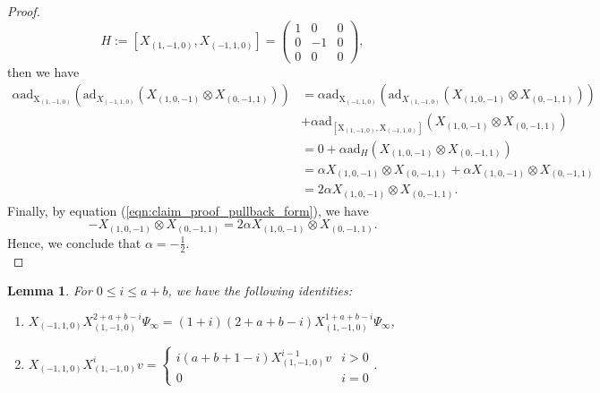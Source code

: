 \documentclass[11pt, a4paper]{amsart}
\theoremstyle{plain}
\newtheorem{lemma}[theorem]{Lemma}
\theoremstyle{definition}
\numberwithin{equation}{section}
\begin{document}
\begin{proof}
    \begin{equation*}
        H := [X_{(1, -1, 0)}, X_{(-1, 1, 0)}] = \left(\begin{matrix}
                                                    1 & 0 & 0 \\
                                                    0 & -1 & 0 \\
                                                    0 & 0 & 0 
                                                \end{matrix}\right), 
    \end{equation*}
    then we have 
    \begin{align*}
        \alpha \mathrm{ad_{X_{(1, -1, 0)}}}(\mathrm{ad}_{X_{(-1, 1, 0)}}(X_{(1, 0, -1)} \otimes X_{(0, -1, 1)})) &= \alpha \mathrm{ad_{X_{(-1, 1, 0)}}}(\mathrm{ad}_{X_{(1, -1, 0)}}(X_{(1, 0, -1)} \otimes X_{(0, -1, 1)})) \\
        & + \alpha \mathrm{ad_{[X_{(1, -1, 0)}, X_{(-1, 1, 0)}]}}(X_{(1, 0, -1)} \otimes X_{(0, -1, 1)}) \\
        & = 0 + \alpha \mathrm{ad}_{H}(X_{(1, 0, -1)} \otimes X_{(0, -1, 1)}) \\
        & = \alpha X_{(1, 0, -1)} \otimes X_{(0, -1, 1)} + \alpha X_{(1, 0, -1)} \otimes X_{(0, -1, 1)} \\
        & = 2\alpha X_{(1, 0, -1)} \otimes X_{(0, -1, 1)}. 
    \end{align*}
    Finally, by equation (\ref{eqn:claim_proof_pullback_form}), we have 
    \begin{equation*}
        - X_{(1, 0, -1)} \otimes X_{(0, -1, 1)} = 2\alpha X_{(1, 0, -1)} \otimes X_{(0, -1, 1)}.
    \end{equation*}
    Hence, we conclude that $\alpha = -\frac{1}{2}$. \\
\end{proof}

\begin{lemma}
\label{Lemma: lower and up vector}
For $0 \le i \le a + b$, we have the following identities: 
\begin{enumerate} 
        \item $X_{(-1, 1, 0)}X^{2 + a + b - i}_{(1, -1, 0)} \Psi_{\infty}  = (1 + i)(2 + a + b - i)X_{(1, -1, 0)}^{1 + a + b - i} \Psi_{\infty}$, 
        \item $X_{(-1, 1, 0)} X_{(1, -1 ,0)}^{i} v = \begin{cases}
                                                            i(a + b + 1 - i) X^{i - 1}_{(1, -1, 0)} v & i > 0 \\
                                                            0 & i = 0
                                                          \end{cases}. $
\end{enumerate}    
\end{lemma}
\end{document}
